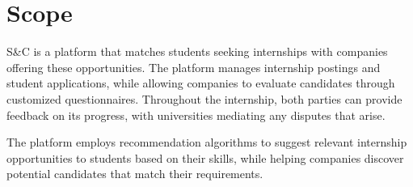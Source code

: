 \section{Scope}
\label{sec:scope}%

\par S\&C is a platform that matches students seeking internships with companies offering these opportunities. The
platform manages internship postings and student applications, while allowing companies to evaluate candidates through
customized questionnaires. Throughout the internship, both parties can provide feedback on its progress, with
universities mediating any disputes that arise.

\par The platform employs recommendation algorithms to suggest relevant internship opportunities to students based on
their skills, while helping companies discover potential candidates that match their requirements.
